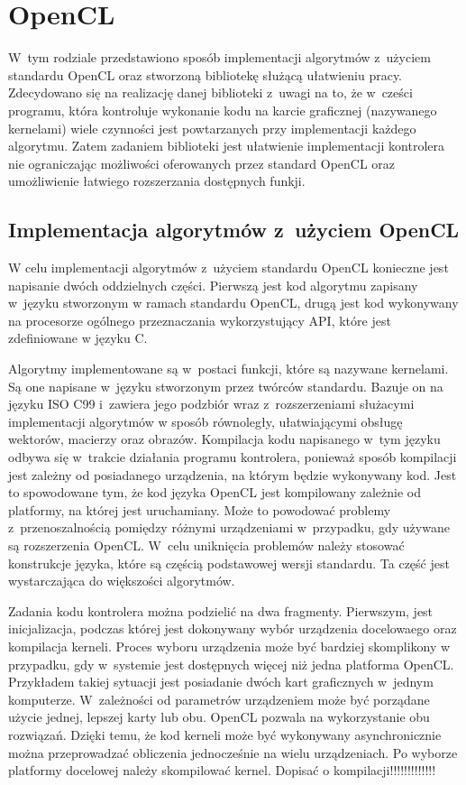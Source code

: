 \chapter{OpenCL}
\label{cha:opencl}

W~tym rodziale przedstawiono sposób implementacji algorytmów z~użyciem standardu OpenCL oraz stworzoną bibliotekę służącą ułatwieniu pracy. Zdecydowano się na realizację danej biblioteki z~uwagi na to, że w~cześci programu, która kontroluje wykonanie kodu na karcie graficznej (nazywanego kernelami) wiele czynności jest powtarzanych przy implementacji każdego algorytmu. Zatem zadaniem biblioteki jest ułatwienie implementacji kontrolera nie ograniczając możliwości oferowanych przez standard OpenCL oraz umożliwienie łatwiego rozszerzania dostępnych funkji.

\section{Implementacja algorytmów z~użyciem OpenCL}  
\label{sec:szczegolyOpenCL}

W celu implementacji algorytmów z~użyciem standardu OpenCL konieczne jest napisanie dwóch oddzielnych części. Pierwszą jest kod algorytmu zapisany w~języku stworzonym w ramach standardu OpenCL, drugą jest kod wykonywany na procesorze ogólnego przeznaczania wykorzystujący API, które jest zdefiniowane w języku C.

Algorytmy implementowane są w~postaci funkcji, które są nazywane kernelami. Są one napisane w~języku stworzonym przez twórców standardu. Bazuje on na języku ISO C99 i~zawiera jego podzbiór wraz z~rozszerzeniami służacymi implementacji algorytmów w sposób równoległy, ułatwiającymi obsługę wektorów, macierzy oraz obrazów. Kompilacja kodu napisanego w~tym języku odbywa się w~trakcie działania programu kontrolera, ponieważ sposób kompilacji jest zależny od posiadanego urządzenia, na którym będzie wykonywany kod. Jest to spowodowane tym, że kod języka OpenCL jest kompilowany zależnie od platformy, na której jest uruchamiany. Może to powodować problemy z~przenoszalnością pomiędzy różnymi urządzeniami w~przypadku, gdy używane są rozszerzenia OpenCL. W~celu uniknięcia problemów należy stosować konstrukcje języka, które są częścią podstawowej wersji standardu. Ta część jest wystarczająca do większości algorytmów.

Zadania kodu kontrolera można podzielić na dwa fragmenty. Pierwszym, jest inicjalizacja, podczas której jest dokonywany wybór urządzenia docelowaego oraz kompilacja kerneli. Proces wyboru urządzenia może być bardziej skomplikony w przypadku, gdy w~systemie jest dostępnych więcej niż jedna platforma OpenCL. Przykładem takiej sytuacji jest posiadanie dwóch kart graficznych w~jednym komputerze. W~zależności od parametrów urządzeniem może być porządane użycie jednej, lepszej karty lub obu. OpenCL pozwala na wykorzystanie obu rozwiązań. Dzięki temu, że kod kerneli może być wykonywany asynchronicznie można przeprowadzać obliczenia jednocześnie na wielu urządzeniach. Po wyborze platformy docelowej należy skompilować kernel. Dopisać o kompilacji!!!!!!!!!!!!!

